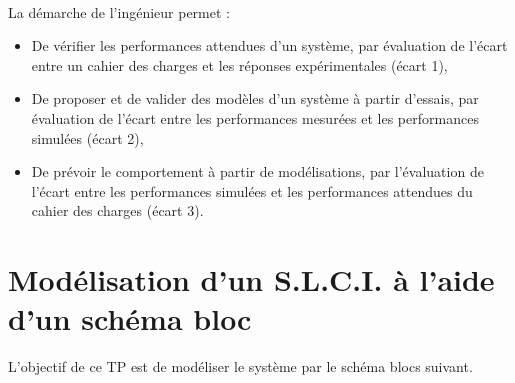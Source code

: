 

 \\

\graphicspath{{../../../img/}}
\begin{center}
\def\svgwidth{\columnwidth}

\end{center}

La démarche de l’ingénieur permet :
\begin{itemize}
 \item De vérifier les performances attendues d’un système, par évaluation de l’écart entre un cahier des charges et les réponses expérimentales (écart 1),
 \item De proposer et de valider des modèles d’un système à partir d’essais, par évaluation de l’écart entre les performances mesurées et les performances simulées (écart 2),
 \item De prévoir le comportement à partir de modélisations, par l’évaluation de l’écart entre les performances simulées et les performances attendues du cahier des charges (écart 3).
\end{itemize}


\newpage

\section{Modélisation d'un S.L.C.I. à l'aide d'un schéma bloc} 


L'objectif de ce TP est de modéliser le système par le schéma blocs suivant.

\graphicspath{{"../../../Systemes/\systemes/"}}

\begin{center}
\def\svgwidth{\columnwidth}

\end{center}

